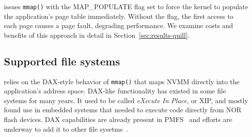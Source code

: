 \DAChell{} issues \texttt{mmap()} with the MAP\_POPULATE flag set to force the kernel to
populate the application's page table immediately.  Without the flag, the first
access to each page causes a page fault, degrading performance.  We examine costs and benefits of this approach in detail in Section~\ref{sec:results-quill}.

\subsection{Supported file systems}
\label{sec:dax-quill}

\DAChell{} relies on the DAX-style behavior of \texttt{mmap()} that maps NVMM
directly into the application's address space.  DAX-like functionality has
existed in some file systems for many years.  It used to be called
\emph{eXecute In Place}, or XIP, and mostly found use in embedded systems that
needed to execute
code directly from NOR flash devices.  DAX capabilities are already present in
PMFS~\cite{PMFS} and efforts are underway to add it to other file sysetms~\cite{ext4dax}.
